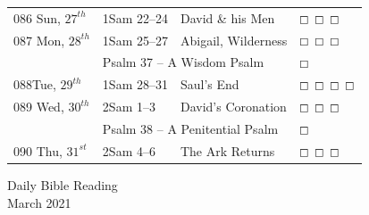 \documentclass[10pt,landscape,twocolumn,letterpaper]{article}
\begin{document}
\begin{tabular}{p{0.75in}p{0.8in}p{1.7in}p{0.50in}}
\tiny 086 \normalsize \textcolor[rgb]{0.00,0.00,1.00}{Sun, $27^{th}$} & \textcolor[rgb]{0.00,0.00,1.00}{1Sam 22--24} & \textcolor[rgb]{0.50,0.50,0.50}{\small David \& his Men} &  $\boxempty$ $\boxempty$ $\boxempty$\\

\tiny 087 \normalsize \textcolor[rgb]{0.00,0.00,1.00}{Mon, $28^{th}$} & \textcolor[rgb]{0.00,0.00,1.00}{1Sam 25--27} & \textcolor[rgb]{0.50,0.50,0.50}{\small Abigail, Wilderness} &  $\boxempty$ $\boxempty$ $\boxempty$\\
     & \multicolumn{2}{l}{\textcolor[rgb]{1.00,0.00,0.00}{Psalm 37 -- A Wisdom Psalm}} & $\boxempty$ \\

\tiny 088\normalsize \textcolor[rgb]{0.00,0.00,1.00}{Tue, $29^{th}$} & \textcolor[rgb]{0.00,0.00,1.00}{1Sam 28--31} & \textcolor[rgb]{0.50,0.50,0.50}{\small Saul's End} & $\boxempty$ $\boxempty$ $\boxempty$ $\boxempty$\\

\tiny 089 \normalsize \textcolor[rgb]{0.00,0.00,1.00}{Wed, $30^{th}$} & \textcolor[rgb]{0.00,0.00,1.00}{2Sam 1--3} & \textcolor[rgb]{0.50,0.50,0.50}{\small David's Coronation} &  $\boxempty$ $\boxempty$ $\boxempty$\\
     & \multicolumn{2}{l}{\textcolor[rgb]{1.00,0.00,0.00}{Psalm 38 -- A Penitential Psalm}} & $\boxempty$ \\

\tiny 090 \normalsize \textcolor[rgb]{0.00,0.00,1.00}{Thu, $31^{st}$} & \textcolor[rgb]{0.00,0.00,1.00}{2Sam 4--6} & \textcolor[rgb]{0.50,0.50,0.50}{\small The Ark Returns} &  $\boxempty$ $\boxempty$ $\boxempty$\\

\end{tabular}





\newpage
\LARGE
\begin{center}
\textcolor[rgb]{0.98,0.00,0.00}{Daily Bible Reading}\\
\textcolor[rgb]{0.00,0.00,1.00}{March 2021}\\
\end{center}
\end{document}
